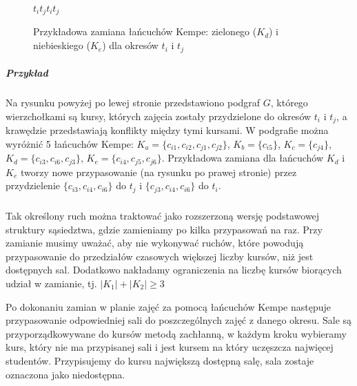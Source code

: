 \begin{enumerate}
\begin{figure}[H]
$t_i$\hspace{4.5cm}$t_j$\hspace{3.25cm}$t_i$\hspace{4.5cm}$t_j$ \\

\caption{Przykładowa zamiana łańcuchów Kempe: zielonego ($K_d$) i niebieskiego ($K_e$) dla okresów $t_i$ i $t_j$}
\end{figure}

\subparagraph{Przykład} 
Na rysunku powyżej po lewej stronie przedstawiono podgraf $G$, którego wierzchołkami są kursy, których zajęcia zostały przydzielone do okresów $t_i$ i $t_j$, a krawędzie przedstawiają konflikty między tymi kursami. W podgrafie można wyróżnić 5 łańcuchów Kempe: $K_a = \{c_{i1}, c_{i2}, c_{j1}, c_{j2}\}$, $K_b = \{c_{i5}\}$, $K_c = \{c_{j4}\}$, $K_d = \{c_{i3}, c_{i6}, c_{j3}\}$, $K_e = \{c_{i4}, c_{j5}, c_{j6}\}$. Przykładowa zamiana dla łańcuchów $K_d$ i $K_e$ tworzy nowe przypasowanie (na rysunku po prawej stronie) przez przydzielenie $\{c_{i3}, c_{i4}, c_{i6}\}$ do $t_j$ i $\{c_{j3}, c_{i4}, c_{i6}\}$ do $t_i$.

\subparagraph{}Tak określony ruch można traktować jako rozszerzoną wersję podstawowej struktury sąsiedztwa, gdzie zamieniamy po kilka przypasowań na raz. Przy zamianie musimy uważać, aby nie wykonywać ruchów, które powodują przypasowanie do przedziałów czasowych większej liczby kursów, niż jest dostępnych sal. Dodatkowo nakładamy ograniczenia na liczbę kursów biorących udział w zamianie, tj. $|K_1|+ |K_2| \geq 3 $

\par Po dokonaniu zamian w planie zajęć za pomocą łańcuchów Kempe następuje przypasowanie odpowiedniej sali do poszczególnych zajęć z danego okresu. Sale są przyporządkowywane do kursów metodą zachłanną, w każdym kroku wybieramy kurs, który nie ma przypisanej sali i jest kursem na który uczęszcza najwięcej studentów. Przypisujemy do kursu największą dostępną salę, sala zostaje oznaczona jako niedostępna.

\end{enumerate}
